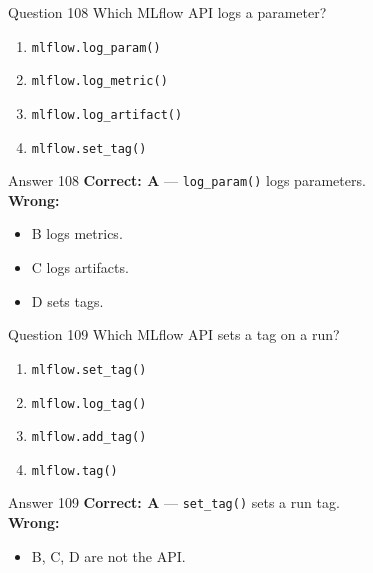 \documentclass[aspectratio=169,11pt]{beamer}
\begin{document}
	\begin{frame}{Question 108}
		Which MLflow API logs a parameter?
		\begin{enumerate}[label=\Alph*.]
			\item \texttt{mlflow.log\_param()}
			\item \texttt{mlflow.log\_metric()}
			\item \texttt{mlflow.log\_artifact()}
			\item \texttt{mlflow.set\_tag()}
		\end{enumerate}
	\end{frame}
	\begin{frame}{Answer 108}
		\textbf{Correct: A} --- \texttt{log\_param()} logs parameters.\\
		\vspace{0.5em}
		\textbf{Wrong:}
		\begin{itemize}
			\item B logs metrics.
			\item C logs artifacts.
			\item D sets tags.
		\end{itemize}
	\end{frame}
	
	\begin{frame}{Question 109}
		Which MLflow API sets a tag on a run?
		\begin{enumerate}[label=\Alph*.]
			\item \texttt{mlflow.set\_tag()}
			\item \texttt{mlflow.log\_tag()}
			\item \texttt{mlflow.add\_tag()}
			\item \texttt{mlflow.tag()}
		\end{enumerate}
	\end{frame}
	\begin{frame}{Answer 109}
		\textbf{Correct: A} --- \texttt{set\_tag()} sets a run tag.\\
		\vspace{0.5em}
		\textbf{Wrong:}
		\begin{itemize}
			\item B, C, D are not the API.
		\end{itemize}
	\end{frame}
	
\end{document}
